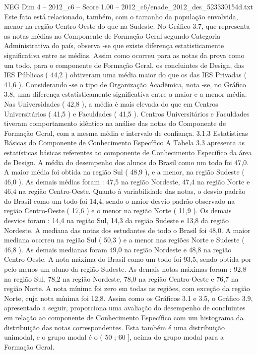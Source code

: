 \begin{textsample}{NEG Dim 4 – 2012\_c6 – Score 1.00 – 2012\_c6/enade\_2012\_des\_523330154d.txt}
Este fato está relacionado, também, com o tamanho da população envolvida, menor na região Centro-Oeste do que na Sudeste.
No Gráfico 3.7, que representa as notas médias no Componente de Formação Geral segundo Categoria Administrativa do país, observa -se que existe diferença estatisticamente significativa entre as médias.
Assim como ocorreu para as notas da prova como um todo, para o componente de Formação Geral, os concluintes de Design, das IES Públicas ( 44,2 ) obtiveram uma média maior do que os das IES Privadas ( 41,6 ).
Considerando -se o tipo de Organização Acadêmica, nota -se, no Gráfico 3.8, uma diferença estatisticamente significativa entre a maior e a menor média.
Nas Universidades ( 42,8 ), a média é mais elevada do que em Centros Universitários ( 41,5 ) e Faculdades ( 41,5 ).
Centros Universitários e Faculdades tiveram comportamento idêntico na análise das notas do Componente de Formação Geral, com a mesma média e intervalo de confiança. 3.1.3 Estatísticas Básicas do Componente de Conhecimento Específico A Tabela 3.3 apresenta as estatísticas básicas referentes ao componente de Conhecimento Específico da área de Design.
A média do desempenho dos alunos do Brasil como um todo foi 47,0.
A maior média foi obtida na região Sul ( 48,9 ), e a menor, na região Sudeste ( 46,0 ).
As demais médias foram : 47,5 na região Nordeste, 47,4 na região Norte e 46,4 na região Centro-Oeste.
Quanto à variabilidade das notas, o desvio padrão do Brasil como um todo foi 14,4, sendo o maior desvio padrão observado na região Centro-Oeste ( 17,6 ) e o menor na região Norte ( 11,9 ).
Os demais desvios foram : 14,4 na região Sul, 14,3 da região Sudeste e 13,8 da região Nordeste.
A mediana das notas dos estudantes de todo o Brasil foi 48,0.
A maior mediana ocorreu na região Sul ( 50,3 ) e a menor nas regiões Norte e Sudeste ( 46,8 ).
As demais medianas foram 49,0 na região Nordeste e 48,8 na região Centro-Oeste.
A nota máxima do Brasil como um todo foi 93,5, sendo obtida por pelo menos um aluno da região Sudeste.
As demais notas máximas foram : 92,8 na região Sul, 78,2 na região Nordeste, 78,0 na região Centro-Oeste e 76,7 na região Norte.
A nota mínima foi zero em todas as regiões, com exceção da região Norte, cuja nota mínima foi 12,8.
Assim como os Gráficos 3.1 e 3.5, o Gráfico 3.9, apresentado a seguir, proporciona uma avaliação do desempenho de concluintes em relação ao componente de Conhecimento Específico com um histograma da distribuição das notas correspondentes.
Esta também é uma distribuição unimodal, e o grupo modal é o ( 50 ; 60 ], acima do grupo modal para a Formação Geral.

\end{textsample}
